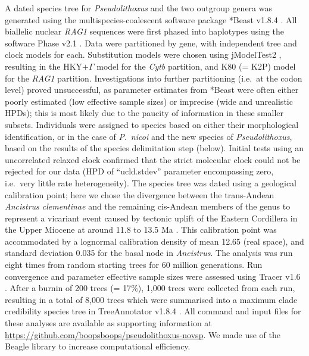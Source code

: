 \documentclass[12pt]{article}
\begin{document}
A dated species tree for \emph{Pseudolithoxus} and the two outgroup genera was generated using the multispecies-coalescent software package *Beast v1.8.4 \citep{Heled2010}. %
All biallelic nuclear \emph{RAG1} sequences were first phased into haplotypes using the software Phase v2.1 \citep{Stephens2003}. %
Data were partitioned by gene, with independent tree and clock models for each. %
Substitution models were chosen using jModelTest2 \citep{Darriba2012}, resulting in the HKY$+\Gamma$ model for the \emph{Cytb} partition, and K80 (= K2P) model for the \emph{RAG1} partition. %
Investigations into further partitioning (i.e.\ at the codon level) proved unsuccessful, as parameter estimates from *Beast were often either poorly estimated (low effective sample sizes) or imprecise (wide and unrealistic HPDs); this is most likely due to the paucity of information in these smaller subsets. %
Individuals were assigned to species based on either their morphological identification, or in the case of \emph{P}.\ \emph{nicoi} and the new species of \emph{Pseudolithoxus}, based on the results of the species delimitation step (below). %
Initial tests using an uncorrelated relaxed clock confirmed that the strict molecular clock could not be rejected for our data (HPD of ``ucld.stdev'' parameter encompassing zero, i.e.\ very little rate heterogeneity). %
The species tree was dated using a geological calibration point; here we chose the divergence between the trans-Andean \emph{Ancistrus clementinae} and the remaining cis-Andean members of the genus to represent a vicariant event caused by tectonic uplift of the Eastern Cordillera in the Upper Miocene at around 11.8 to 13.5 Ma \citep{Albert2011}. %
This calibration point was accommodated by a lognormal calibration density of mean 12.65 (real space), and standard deviation 0.035 for the basal node in \emph{Ancistrus}. %
The analysis was run eight times from random starting trees for 60 million generations. %
Run convergence and parameter effective sample sizes were assessed using Tracer v1.6 \citet{Rambaut2014}. %
After a burnin of 200 trees (= 17\%), 1,000 trees were collected from each run, resulting in a total of 8,000 trees which were summarised into a maximum clade credibility species tree in TreeAnnotator v1.8.4 \citep{Rambaut2016}. %
All command and input files for these analyses are available as supporting information at \href{https://github.com/boopsboops/pseudolithoxus-novsp}{https://github.com/boopsboops/pseudolithoxus-novsp}. %
We made use of the Beagle library \citep{Ayres2012} to increase computational efficiency.%
\end{document}

